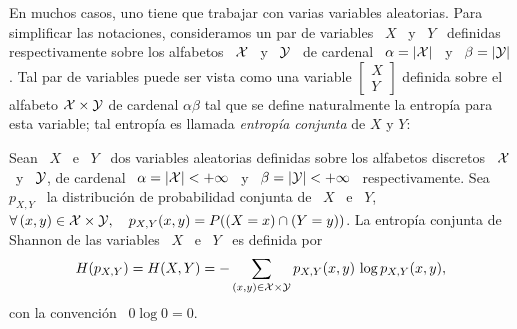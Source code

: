 En muchos  casos, uno tiene que  trabajar con varias  variables aleatorias. Para
simplificar las notaciones, consideramos  un par de variables \ $X$ \  y \ $Y$ \
definidas respectivamente sobre los alfabetos \ $\mathcal{X}$  \ y \ $\mathcal{Y}$ \ de cardenal \
$\alpha = |\mathcal{X}|$ \ y \ $\beta = |\mathcal{Y}|$.  Tal par de variables puede ser vista como
una variable $\begin{bmatrix} X\\ Y\end{bmatrix}$ definida sobre el alfabeto $\mathcal{X}
\times  \mathcal{Y}$  de  cardenal $\alpha  \beta$  tal  que  se define  naturalmente  la
entrop\'ia  para  esta  variable;  tal  entrop\'ia es  llamada  {\it  entrop\'ia
  conjunta} de $X$ y $Y$:
%
\begin{definicion}
\label{Def:SZ:EntropiaConjunta}
%
  Sean \ $X$ \ e \ $Y$  \ dos variables aleatorias definidas sobre los alfabetos
  discretos \  $\mathcal{X}$ \ y \ $\mathcal{Y}$,  de cardenal \ $\alpha  = |\mathcal{X}| < +\infty$  \ y \
  $\beta  =  |\mathcal{Y}|   <  +\infty$  \  respectivamente.   Sea   \  $p_{X,Y}$  \  la
  distribuci\'on de probabilidad conjunta de \ $X$ \ e \ $Y$, \ \ie $ \forall \,
  (x,y) \in \mathcal{X} \times  \mathcal{Y}, \quad p_{X,Y}(x,y) = P( (X = x) \cap  (Y = y) )$.  La
  entrop\'ia conjunta de Shannon de las variables  \ $X$ \ e \ $Y$ \ es definida
  por
  \[
  H(p_{X,Y}) =  H(X,Y) = -  \sum_{(x,y) \in \mathcal{X}  \times \mathcal{Y}} p_{X,Y}(x,y)  \, \log
  p_{X,Y}(x,y),
  \]
  con la convenci\'on \ $0 \log 0 = 0$.
\end{definicion}

